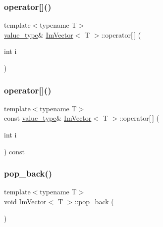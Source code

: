 \hypertarget{class_im_vector_a59a3eeadda07579727de93ca6844b91e}{}\label{class_im_vector_a59a3eeadda07579727de93ca6844b91e} 
\subsubsection{\texorpdfstring{operator[]()}{operator[]()}\hspace{0.1cm}{\footnotesize\ttfamily [1/2]}}
{\footnotesize\ttfamily template$<$typename T$>$ \\
\hyperlink{class_im_vector_a8bd77e4e7581d8e5f9e98d7c2f3c2a80}{value\+\_\+type}\& \hyperlink{class_im_vector}{Im\+Vector}$<$ T $>$\+::operator\mbox{[}$\,$\mbox{]} (\begin{DoxyParamCaption}\item[{int}]{i }\end{DoxyParamCaption})}

\hypertarget{class_im_vector_ab97c3f6f1943602e36afb593c6f03ff1}{}\label{class_im_vector_ab97c3f6f1943602e36afb593c6f03ff1} 
\subsubsection{\texorpdfstring{operator[]()}{operator[]()}\hspace{0.1cm}{\footnotesize\ttfamily [2/2]}}
{\footnotesize\ttfamily template$<$typename T$>$ \\
const \hyperlink{class_im_vector_a8bd77e4e7581d8e5f9e98d7c2f3c2a80}{value\+\_\+type}\& \hyperlink{class_im_vector}{Im\+Vector}$<$ T $>$\+::operator\mbox{[}$\,$\mbox{]} (\begin{DoxyParamCaption}\item[{int}]{i }\end{DoxyParamCaption}) const}

\hypertarget{class_im_vector_a3db7ce62d3c429effdb893fbf7148c1c}{}\label{class_im_vector_a3db7ce62d3c429effdb893fbf7148c1c} 
\subsubsection{\texorpdfstring{pop\+\_\+back()}{pop\_back()}}
{\footnotesize\ttfamily template$<$typename T$>$ \\
void \hyperlink{class_im_vector}{Im\+Vector}$<$ T $>$\+::pop\+\_\+back (\begin{DoxyParamCaption}{ }\end{DoxyParamCaption})}

